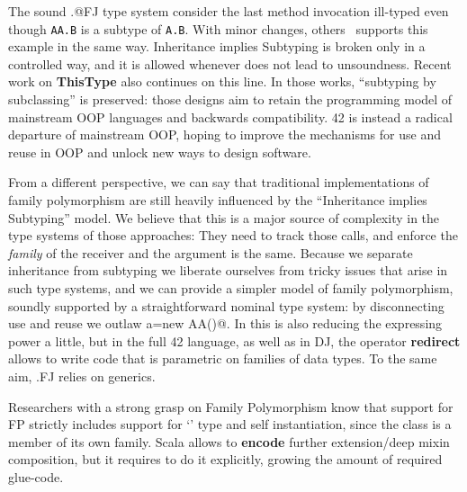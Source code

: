 The sound \Q@.@FJ type system consider the last method invocation ill-typed even though \lstinline{AA.B} is a subtype of \lstinline{A.B}.
With minor changes, others~\cite{nystrom2006j,Ernst06,BruceEtAl98,IgarashiViroli07}
supports this example in the same way.
Inheritance implies Subtyping is broken only in a controlled way, and it is allowed whenever does not lead to unsoundness.
Recent work on {\bf ThisType} \cite{Saito:2009,ryu16ThisType}
also continues on this line.
In those works, ``subtyping by subclassing'' is preserved: those designs aim to retain the programming model of mainstream OOP languages and backwards compatibility. 42 is instead a radical departure of mainstream OOP, hoping to improve the mechanisms for use and reuse in OOP and unlock new ways to design software.

From a different perspective, we can say that traditional
implementations of family polymorphism are still heavily influenced by
the ``Inheritance implies Subtyping'' model.
We believe that this is a major source of complexity in the type
systems of those approaches:
They need to track those calls, and enforce the \emph{family} of the receiver and the argument is the same.
Because we separate inheritance from subtyping we liberate ourselves
from tricky issues that arise in such type systems, and we can
provide a simpler model of family polymorphism, soundly supported by 
a straightforward nominal type system:
by disconnecting use and reuse we outlaw \Q@A a=new AA()@.
In \name this is also reducing the expressing power a little, but
in the full 42 language, as well as in DJ, the operator \textbf{redirect} allows to write code that is parametric on families of data types.
To the same aim, .FJ relies on generics.

Researchers with a strong grasp on Family
Polymorphism know that support for FP strictly includes
support for `\Q@This@' type and self instantiation, since the
class is a member of its own family.
Scala allows to \textbf{encode} further extension/deep mixin composition,
but it requires to do it explicitly, growing the amount of required glue-code.





